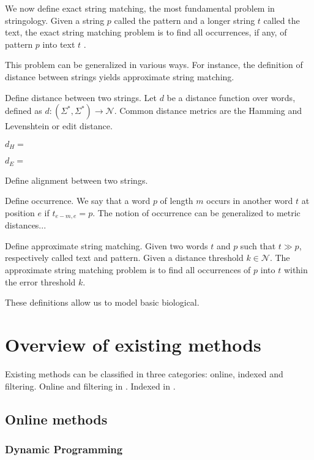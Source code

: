 We now define exact string matching, the most fundamental problem in stringology.
Given a string $p$ called the pattern and a longer string $t$ called the text, the exact string matching problem is to find all occurrences, if any, of pattern $p$ into text $t$ \cite{Gusfield1997}.

This problem can be generalized in various ways. For instance, the definition of distance between strings yields approximate string matching.


Define distance between two strings.
Let $d$ be a distance function over words, defined as $d : (\Sigma^{*}, \Sigma^{*}) \rightarrow \mathcal{N}$.
Common distance metrics are the Hamming and Levenshtein or edit distance.

$d_H = $

$d_E = $

Define alignment between two strings.


Define occurrence.
We say that a word $p$ of length $m$ occurs in another word $t$ at position $e$ if $t_{e-m, e} = p$.
The notion of occurrence can be generalized to metric distances...

Define approximate string matching.
Given two words $t$ and $p$ such that $t \gg p$, respectively called text and pattern. Given a distance threshold $k \in \mathcal{N}$.
The approximate string matching problem is to find all occurrences of $p$ into $t$ within the error threshold $k$.

These definitions allow us to model basic biological.



\section{Overview of existing methods}

Existing methods can be classified in three categories: online, indexed and filtering.
Online and filtering in \cite{Navarro1998}. Indexed in \cite{Navarro2001}.


\subsection{Online methods}

\subsubsection{Dynamic Programming}

